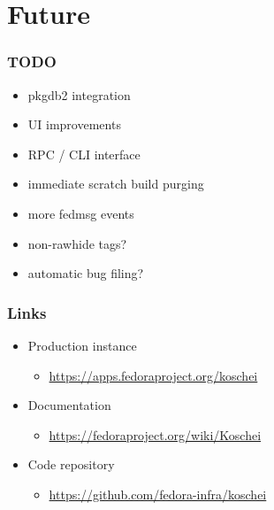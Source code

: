 \documentclass[pdftex,unicode,xcolor=table]{beamer}
\begin{document}
\section{Future}
\begin{frame}
  \frametitle{TODO}
  \begin{itemize}
    \item pkgdb2 integration
    \item UI improvements
    \item RPC / CLI interface
    \item immediate scratch build purging
    \item more fedmsg events
    \item non-rawhide tags?
    \item automatic bug filing?
  \end{itemize}
\end{frame}

\begin{frame}
  \frametitle{Links}
  \begin{itemize}
    \item Production instance
    \begin{itemize}
      \item \url{https://apps.fedoraproject.org/koschei}
    \end{itemize}
    \item Documentation
    \begin{itemize}
      \item \url{https://fedoraproject.org/wiki/Koschei}
    \end{itemize}
    \item Code repository
    \begin{itemize}
      \item \url{https://github.com/fedora-infra/koschei}
    \end{itemize}
  \end{itemize}
\end{frame}




 {
  \Rhbg{\frame{\theend}}
}
\end{document}
